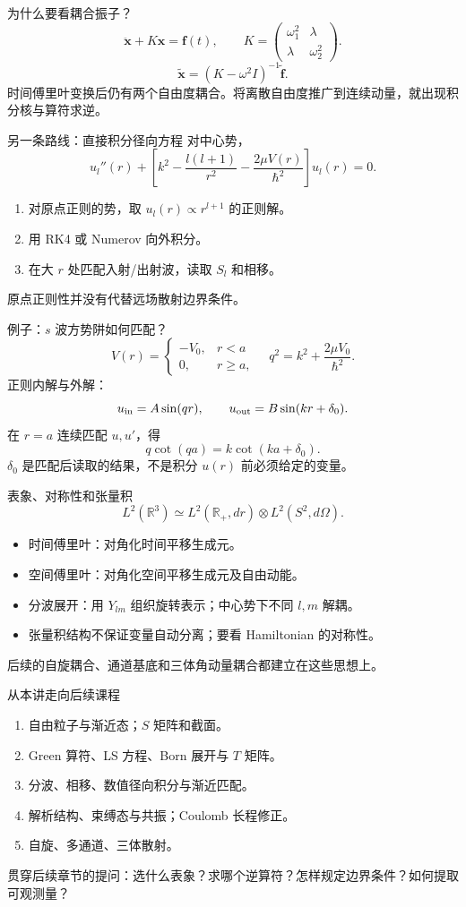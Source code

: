 \documentclass[aspectratio=169,11pt]{beamer}
\begin{document}
\begin{frame}{为什么要看耦合振子？}
\[
\ddot{\bm x}+K\bm x=\bm f(t),\qquad
K=\begin{pmatrix}\omega_1^2&\lambda\\\lambda&\omega_2^2\end{pmatrix}.
\]
\[
\widetilde{\bm x}=(K-\omega^2 I)^{-1}\widetilde{\bm f}.
\]
时间傅里叶变换后仍有两个自由度耦合。将离散自由度推广到连续动量，就出现积分核与算符求逆。
\end{frame}
\begin{frame}{另一条路线：直接积分径向方程}
对中心势，
\[
u_l''(r)+\left[k^2-\frac{l(l+1)}{r^2}
-\frac{2\mu V(r)}{\hbar^2}\right]u_l(r)=0.
\]
\begin{enumerate}
\item 对原点正则的势，取 $u_l(r)\propto r^{l+1}$ 的正则解。
\item 用 RK4 或 Numerov 向外积分。
\item 在大 $r$ 处匹配入射/出射波，读取 $S_l$ 和相移。
\end{enumerate}
原点正则性并没有代替远场散射边界条件。
\end{frame}
\begin{frame}{例子：$s$ 波方势阱如何匹配？}
\[
V(r)=\begin{cases}-V_0,&r<a\\0,&r\ge a,\end{cases}
\quad q^2=k^2+\frac{2\mu V_0}{\hbar^2}.
\]
正则内解与外解：
\[
u_{\rm in}=A\sin(qr),\qquad
u_{\rm out}=B\sin(kr+\delta_0).
\]
在 $r=a$ 连续匹配 $u,u'$，得
\[
q\cot(qa)=k\cot(ka+\delta_0).
\]
$\delta_0$ 是匹配后读取的结果，不是积分 $u(r)$ 前必须给定的变量。
\end{frame}
\begin{frame}{表象、对称性和张量积}
\[
L^2(\mathbb R^3)\simeq L^2(\mathbb R_+,dr)\otimes L^2(S^2,d\Omega).
\]
\begin{itemize}
\item 时间傅里叶：对角化时间平移生成元。
\item 空间傅里叶：对角化空间平移生成元及自由动能。
\item 分波展开：用 $Y_{lm}$ 组织旋转表示；中心势下不同 $l,m$ 解耦。
\item 张量积结构不保证变量自动分离；要看 Hamiltonian 的对称性。
\end{itemize}
后续的自旋耦合、通道基底和三体角动量耦合都建立在这些思想上。
\end{frame}
\begin{frame}{从本讲走向后续课程}
\begin{enumerate}
\item 自由粒子与渐近态；$S$ 矩阵和截面。
\item Green 算符、LS 方程、Born 展开与 $T$ 矩阵。
\item 分波、相移、数值径向积分与渐近匹配。
\item 解析结构、束缚态与共振；Coulomb 长程修正。
\item 自旋、多通道、三体散射。
\end{enumerate}
贯穿后续章节的提问：选什么表象？求哪个逆算符？怎样规定边界条件？如何提取可观测量？
\end{frame}
\end{document}
